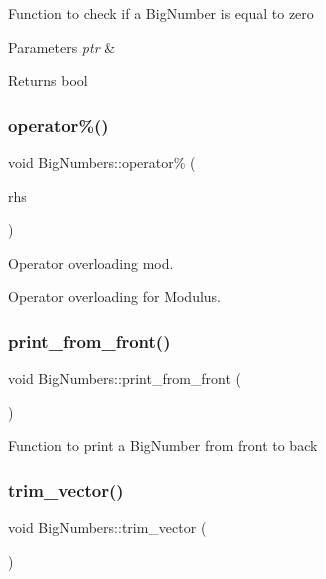 Function to check if a Big\+Number is equal to zero 
\begin{DoxyParams}{Parameters}
{\em ptr} & \\
\hline
\end{DoxyParams}
\begin{DoxyReturn}{Returns}
bool 
\end{DoxyReturn}
\mbox{\label{classBigNumbers_a26d585ea0e5f990a7e592e0060cc06d6}} 
\subsubsection{\texorpdfstring{operator\%()}{operator\%()}}
{\footnotesize\ttfamily void Big\+Numbers\+::operator\% (\begin{DoxyParamCaption}\item[{\mbox{\hyperlink{classBigNumbers}{Big\+Numbers}} \&}]{rhs }\end{DoxyParamCaption})}



Operator overloading mod. 

Operator overloading for Modulus. \mbox{\label{classBigNumbers_ae5d36fdc52a34e361f7aabcd26b2779f}} 
\subsubsection{\texorpdfstring{print\+\_\+from\+\_\+front()}{print\_from\_front()}}
{\footnotesize\ttfamily void Big\+Numbers\+::print\+\_\+from\+\_\+front (\begin{DoxyParamCaption}{ }\end{DoxyParamCaption})}

Function to print a Big\+Number from front to back \mbox{\label{classBigNumbers_a99e5cc37000c1192d718bad688805919}} 
\subsubsection{\texorpdfstring{trim\+\_\+vector()}{trim\_vector()}}
{\footnotesize\ttfamily void Big\+Numbers\+::trim\+\_\+vector (\begin{DoxyParamCaption}{ }\end{DoxyParamCaption})}

